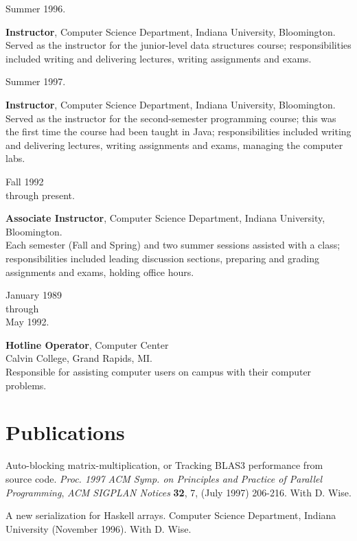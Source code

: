 \documentclass{article}
\begin{document}
\parbox[t]{1in}{Summer 1996.}
\hfill\parbox[t]{5.5in} {
  \textbf{Instructor}, Computer Science Department, Indiana University, Bloomington. \\
  Served as the instructor for the junior-level data structures
  course; responsibilities included writing and delivering lectures,
  writing assignments and exams.}

\parbox[t]{1in}{Summer 1997.}
\hfill\parbox[t]{5.5in} {
  \textbf{Instructor}, Computer Science Department, Indiana University, Bloomington. \\
  Served as the instructor for the second-semester programming course;
  this was the first time the course had been taught in Java;
  responsibilities included writing and delivering lectures, writing
  assignments and exams, managing the computer labs.}

\smallskip

\parbox[t]{1in}{\sloppy Fall 1992 \\ through present.}
\hfill\parbox[t]{5.5in}{
  \textbf{Associate Instructor}, Computer Science Department, Indiana University, Bloomington.  \\
  Each semester (Fall and Spring) and two summer sessions assisted
  with a class; responsibilities included leading discussion sections,
  preparing and grading assignments and exams, holding office hours.}

\smallskip

\parbox[t]{1in}{January 1989 \\ through \\ May 1992.}
\hfill\parbox[t]{6.5in} {
  \textbf{Hotline Operator}, Computer Center \\
  Calvin College, Grand Rapids, MI. \\
  Responsible for assisting computer users on campus with their
  computer problems.}

\section*{Publications}

\hangindent=0.25in  Auto-blocking matrix-multiplication,
or Tracking BLAS3 performance from source code. \textit{Proc. 1997 ACM
  Symp. on Principles and Practice of Parallel Programming\nocorr},
\textit{ACM SIGPLAN Notices} \textbf{32}, 7, (July 1997) 206-216.
With D. Wise.
 
\smallskip
\hangindent=0.25in 
A new serialization for Haskell arrays.  Computer Science
Department, Indiana University (November 1996).  With D. Wise.
\end{document}
